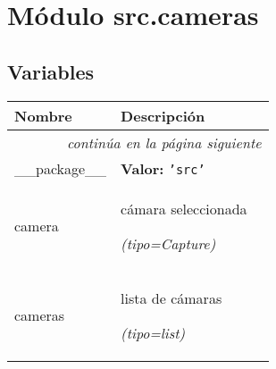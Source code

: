 %
%
%


\section{Módulo src.cameras}

    \label{src:cameras}


  \subsection{Variables}

    \vspace{-1cm}
\hspace{\varindent}\begin{longtable}{|p{\varnamewidth}|p{\vardescrwidth}|l}
\cline{1-2}
\cline{1-2} \centering \textbf{Nombre} & \centering \textbf{Descripción}& \\
\cline{1-2}
\endhead\cline{1-2}\multicolumn{3}{r}{\small\textit{continúa en la página siguiente}}\\\endfoot\cline{1-2}
\endlastfoot\raggedright \_\-\_\-p\-a\-c\-k\-a\-g\-e\-\_\-\_\- & \raggedright \textbf{Valor:} 
{\tt \texttt{'}\texttt{src}\texttt{'}}&\\
\cline{1-2}
\raggedright c\-a\-m\-e\-r\-a\- & \raggedright cámara seleccionada

            {\it (tipo=Capture)}&\\
\cline{1-2}
\raggedright c\-a\-m\-e\-r\-a\-s\- & \raggedright lista de cámaras

            {\it (tipo=list)}&\\
\cline{1-2}
\end{longtable}



